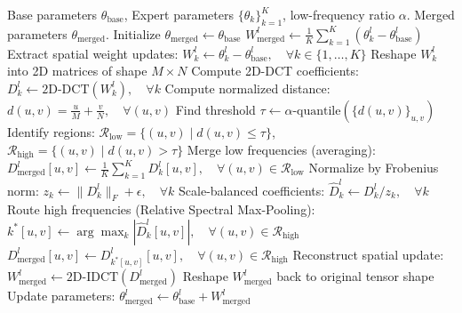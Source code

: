 \documentclass{article}
\theoremstyle{plain}
\theoremstyle{definition}
\theoremstyle{remark}
\begin{document}
\begin{algorithm}[!ht]
   \caption{Spectral Task Decoupling in Fourier Space (STDFS)}
   \label{alg:stdfs}
\begin{small}
\begin{algorithmic}[1]
    Base parameters $\theta_{\text{base}}$, Expert parameters $\{\theta_k\}_{k=1}^K$, low-frequency ratio $\alpha$.
    Merged parameters $\theta_{\text{merged}}$.
   \STATE Initialize $\theta_{\text{merged}} \leftarrow \theta_{\text{base}}$
           \STATE $W^l_{\text{merged}} \leftarrow \frac{1}{K} \sum_{k=1}^K (\theta_k^l - \theta_{\text{base}}^l)$
       \ELSE
           \STATE Extract spatial weight updates: $W^l_k \leftarrow \theta_k^l - \theta_{\text{base}}^l, \quad \forall k \in \{1,\dots,K\}$
           \STATE Reshape $W^l_k$ into 2D matrices of shape $M \times N$
           \STATE Compute 2D-DCT coefficients: $D^l_k \leftarrow \text{2D-DCT}(W^l_k), \quad \forall k$
           \STATE Compute normalized distance: $d(u, v) = \frac{u}{M} + \frac{v}{N}, \quad \forall (u, v)$
           \STATE Find threshold $\tau \leftarrow \alpha\text{-quantile}(\{d(u, v)\}_{u, v})$
           \STATE Identify regions: $\mathcal{R}_{\text{low}} = \{ (u, v) \mid d(u, v) \le \tau \}$, $\mathcal{R}_{\text{high}} = \{ (u, v) \mid d(u, v) > \tau \}$
           \STATE Merge low frequencies (averaging):\\
                  $D^l_{\text{merged}}[u, v] \leftarrow \frac{1}{K} \sum_{k=1}^K D^l_k[u, v], \quad \forall (u, v) \in \mathcal{R}_{\text{low}}$
           \STATE Normalize by Frobenius norm: $z_k \leftarrow \|D^l_k\|_F + \epsilon, \quad \forall k$
           \STATE Scale-balanced coefficients: $\hat{D}^l_k \leftarrow D^l_k / z_k, \quad \forall k$
           \STATE Route high frequencies (Relative Spectral Max-Pooling):\\
                  $k^*[u, v] \leftarrow \arg\max_k |\hat{D}^l_k[u, v]|, \quad \forall (u, v) \in \mathcal{R}_{\text{high}}$\\
                  $D^l_{\text{merged}}[u, v] \leftarrow D^l_{k^*[u, v]}[u, v], \quad \forall (u, v) \in \mathcal{R}_{\text{high}}$
           \STATE Reconstruct spatial update: $W^l_{\text{merged}} \leftarrow \text{2D-IDCT}(D^l_{\text{merged}})$
           \STATE Reshape $W^l_{\text{merged}}$ back to original tensor shape
       \ENDIF
       \STATE Update parameters: $\theta^l_{\text{merged}} \leftarrow \theta^l_{\text{base}} + W^l_{\text{merged}}$
   \ENDFOR
\end{algorithmic}
\end{small}
\end{algorithm}
\end{document}
